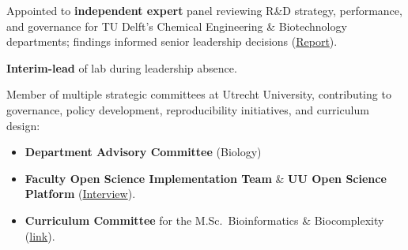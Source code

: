 \documentclass[a4paper,10pt]{article}
\begin{document}
{\begin{adjustbox}{valign=t}
\begin{minipage}[t]{0.6\textwidth}
\begin{description}
\raggedright
\item[\normalfont \textcolor{ForestGreen}{\textbf{2021 -- 2022.}}] Appointed to \textbf{independent expert} panel reviewing R\&D strategy, performance, and governance 
  for TU Delft’s Chemical Engineering \& Biotechnology departments; findings informed senior leadership decisions 
  (\href{https://filelist.tudelft.nl/TUDelft/Onderzoek/Kwaliteitsborging/Final report SEP Chemistry TU Delft 20220204.pdf}{Report}).
\item[\normalfont \textcolor{ForestGreen}{\textbf{2018.}}] \textbf{Interim-lead} of lab during leadership absence.
\item[\normalfont \textcolor{ForestGreen}{\textbf{2019 -- now.}}] Member of multiple strategic committees at Utrecht University, 
contributing to governance, policy development, reproducibility initiatives, and curriculum design:
  \begin{itemize}
    \item \textbf{Department Advisory Committee} (Biology) %
    \item \textbf{Faculty Open Science Implementation Team} \& \textbf{UU Open Science Platform} %
      (\href{https://www.uu.nl/en/news/meet-laura-dijkhuizen}{Interview}).
    \item \textbf{Curriculum Committee} for the M.Sc.\ Bioinformatics \& Biocomplexity %
    (\href{https://www.uu.nl/en/masters/bioinformatics-and-biocomplexity}{link}).
  \end{itemize}

\end{description}
\end{minipage}
\end{adjustbox}}
\end{document}
